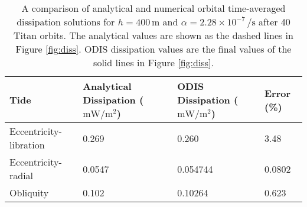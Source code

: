 \begin{table}[!b]
\footnotesize
\centering
\begin{tabularx}{\linewidth}{M{2.5cm} M{1.3cm} M{1.3cm} M{1cm}}
 \toprule
Tide & Analytical Dissipation ($\si{\milli\watt\per\metre\squared}$)& ODIS Dissipation ($\si{\milli\watt\per\metre\squared}$) & Error (\%)\\
 \midrule \midrule
Eccentricity-libration & 0.269 & 0.260 & 3.48\\
Eccentricity-radial & 0.0547 & 0.054744 & 0.0802\\
Obliquity & 0.102 & 0.10264 & 0.623\\
\bottomrule
\end{tabularx}
\caption{A comparison of analytical and numerical orbital time-averaged dissipation solutions for $h = 400 \, \si{\metre}$ and $\alpha = 2.28 \times 10^{-7} \, \si{\per\second}$ after 40 Titan orbits. The analytical values are shown as the dashed lines in Figure \ref{fig:diss}. ODIS dissipation values are the final values of the solid lines in Figure \ref{fig:diss}.\label{tb:diss}}
\end{table}